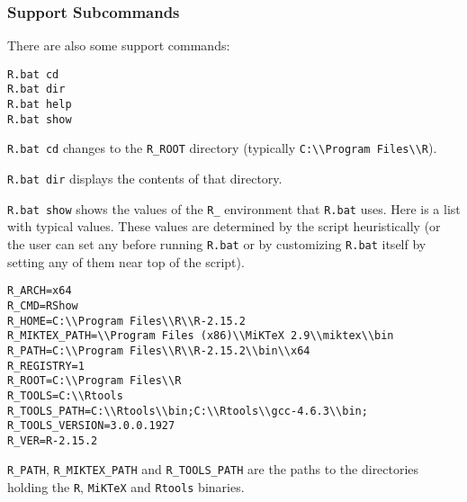 \subsubsection{Support Subcommands}

There are also some support commands:

\begin{verbatim}
R.bat cd
R.bat dir
R.bat help
R.bat show
\end{verbatim}

\texttt{R.bat cd} changes to the \texttt{R\_ROOT} directory (typically
\texttt{C:\textbackslash{}\textbackslash{}Program Files\textbackslash{}\textbackslash{}R}).

\texttt{R.bat dir} displays the contents of that directory.

\texttt{R.bat show} shows the values of the \texttt{R\_} environment
that \texttt{R.bat} uses. Here is a list with typical values. These
values are determined by the script heuristically (or the user can set
any before running \texttt{R.bat} or by customizing \texttt{R.bat}
itself by setting any of them near top of the script).

\begin{verbatim}
R_ARCH=x64
R_CMD=RShow
R_HOME=C:\\Program Files\\R\\R-2.15.2
R_MIKTEX_PATH=\\Program Files (x86)\\MiKTeX 2.9\\miktex\\bin
R_PATH=C:\\Program Files\\R\\R-2.15.2\\bin\\x64
R_REGISTRY=1
R_ROOT=C:\\Program Files\\R
R_TOOLS=C:\\Rtools
R_TOOLS_PATH=C:\\Rtools\\bin;C:\\Rtools\\gcc-4.6.3\\bin;
R_TOOLS_VERSION=3.0.0.1927
R_VER=R-2.15.2
\end{verbatim}

\texttt{R\_PATH}, \texttt{R\_MIKTEX\_PATH} and \texttt{R\_TOOLS\_PATH}
are the paths to the directories holding the \texttt{R}, \texttt{MiKTeX}
and \texttt{Rtools} binaries.

